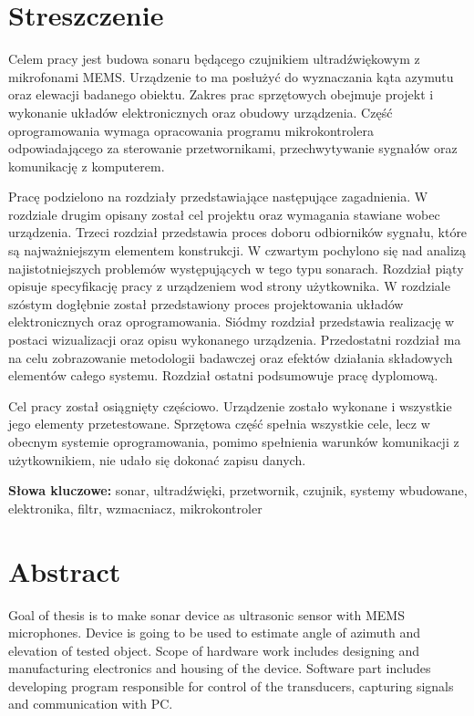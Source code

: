 
\section*{Streszczenie}\label{chapter:streszczenie}
Celem pracy jest budowa sonaru będącego czujnikiem ultradźwiękowym z mikrofonami MEMS. 
Urządzenie to ma posłużyć do wyznaczania kąta azymutu oraz elewacji badanego obiektu.
Zakres prac sprzętowych obejmuje projekt i wykonanie układów elektronicznych oraz obudowy urządzenia. 
Część oprogramowania wymaga opracowania programu mikrokontrolera odpowiadającego za sterowanie przetwornikami, przechwytywanie sygnałów oraz komunikację z komputerem.

Pracę podzielono na rozdziały przedstawiające następujące zagadnienia. W rozdziale drugim opisany został cel projektu oraz wymagania stawiane wobec urządzenia. 
Trzeci rozdział przedstawia proces doboru odbiorników sygnału, które są najważniejszym elementem konstrukcji. 
W czwartym pochylono się nad analizą najistotniejszych problemów występujących w tego typu sonarach. Rozdział piąty opisuje specyfikację pracy z urządzeniem wod strony użytkownika.
W rozdziale szóstym dogłębnie został przedstawiony proces projektowania układów elektronicznych oraz oprogramowania. Siódmy rozdział przedstawia realizację w postaci wizualizacji oraz opisu wykonanego urządzenia.
Przedostatni rozdział ma na celu zobrazowanie metodologii badawczej oraz efektów działania składowych elementów całego systemu. Rozdział ostatni podsumowuje pracę dyplomową.

Cel pracy został osiągnięty częściowo. Urządzenie zostało wykonane i wszystkie jego elementy przetestowane. Sprzętowa część spełnia wszystkie cele, 
lecz w obecnym systemie oprogramowania, pomimo spełnienia warunków komunikacji z użytkownikiem, nie udało się dokonać zapisu danych.

\textbf{Słowa kluczowe: }sonar, ultradźwięki, przetwornik, czujnik, systemy wbudowane, elektronika, filtr, wzmacniacz, mikrokontroler


\section*{Abstract}\label{chapter:abstract}
Goal of thesis is to make sonar device as ultrasonic sensor with MEMS microphones.
Device is going to be used to estimate angle of azimuth and elevation of tested object.
Scope of hardware work includes designing and manufacturing electronics and housing of the device. 
Software part includes developing program responsible for control of the transducers, capturing signals and communication with PC.

